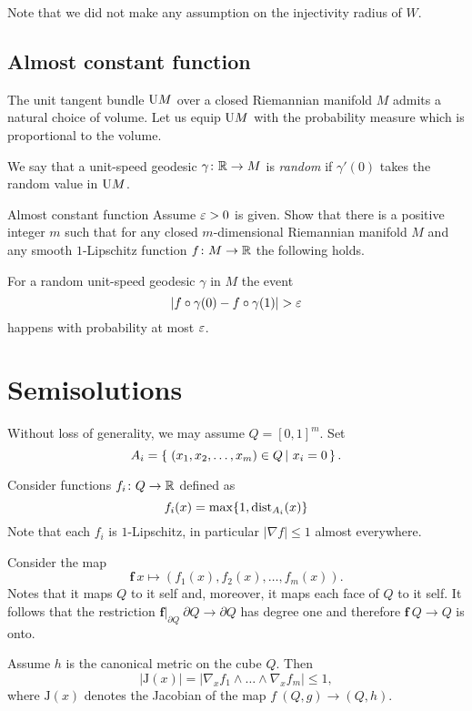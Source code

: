 Note that we did not make any assumption on the injectivity radius of $W$.

\subsection*{Almost constant function}

The unit tangent bundle $\mathrm{U} M$ over a closed Riemannian manifold $M$
admits a natural choice of volume.
Let us equip $\mathrm{U} M$ with the probability measure which is proportional to the volume.

We say that a unit-speed geodesic $\gamma\colon\mathbb{R}\to M$ is \emph{random}
if $\gamma'(0)$ takes the random value in $\mathrm{U} M$.

\begin{pr}{}{Almost constant function}\label{Almost constant function}
Assume $\varepsilon>0$ is given.
Show that there is a positive integer $m$ such that
for any closed $m$-dimensional Riemannian manifold $M$
and any smooth $1$-Lipschitz function $f\colon M\to\mathbb{R}$ the following holds.

For a random unit-speed geodesic $\gamma$ in $M$ 
the event 
\[|f\circ\gamma(0)-f\circ\gamma(1)|>\eps\]
happens with probability at most $\varepsilon$.
\end{pr}



\section*{Semisolutions}

Without loss of generality, we may assume  $Q=[0,1]^m$.
Set 
\[A_i=\set{(x_1,x_2,\dots,x_m)\in Q}{x_i=0}.\]

Consider functions $f_i\colon Q\to\mathbb{R}$ defined as
$$f_i(x)=\max\{1,\operatorname{\rm dist}_{A_i}(x)\}$$
Note that each $f_i$ is $1$-Lipschitz, 
in particular $|\nabla f|\le 1$ almost everywhere.

Consider the map
\[\bm{f}\:x\mapsto(f_1(x),f_2(x),\dots,f_m(x)).\]
Notes that it maps $Q$ to it self
and, moreover, it maps each face of $Q$ to it self.
It follows that the restriction $\bm{f}|_{\partial Q}\:\partial Q\to \partial Q$ has degree one and therefore 
$\bm{f}\:Q\to Q$ is onto.

Assume $h$ is the canonical metric on the cube $Q$.
Then 
\[|\mathrm{J}(x)|=|\nabla_x f_1\wedge\dots\wedge\nabla_xf_m|\le 1,\]
where $\mathrm{J}(x)$ denotes the Jacobian of the map $f\:(Q,g)\to (Q,h)$.

